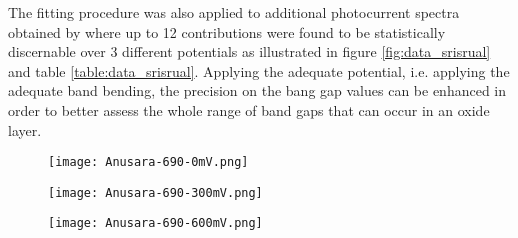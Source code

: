 The fitting procedure was also applied to additional photocurrent spectra 
obtained by \citet{srisrual2013} where up to 12 contributions were found to 
be statistically discernable over 3 different potentials as illustrated in 
figure \ref{fig:data_srisrual} and table \ref{table:data_srisrual}.
Applying the adequate potential, i.e. applying the adequate band bending,
the precision on the bang gap values can be enhanced in order to better
assess the whole range of band gaps that can occur in an oxide layer.

\renewcommand{\coef}{0.35}
\begin{figure*}[htb]
	\centering
	\begin{subfigure}{\coef\textwidth}
		\centering
	 	\texttt{[image: Anusara-690-0mV.png]}
	 	\caption{}
	 	\label{fig:data_srisrual1}
	\end{subfigure}
	\begin{subfigure}{\coef\textwidth}
		\centering
	 	\texttt{[image: Anusara-690-300mV.png]}
	 	\caption{}
	 	\label{fig:data_srisrual2}
	\end{subfigure}

	\begin{subfigure}{\coef\textwidth}
		\centering
	 	\texttt{[image: Anusara-690-600mV.png]}
	 	\caption{}
	 	\label{fig:data_srisrual3}
	\end{subfigure}
	
	\caption{Energy photocurrent spectra recorded at different applied potentials 
    on a Ni-based alloy A600 oxidized at 900°C in oxygen for 2h (according to \citep{srisrual2013}).}
	\label{fig:data_srisrual}
\end{figure*}

